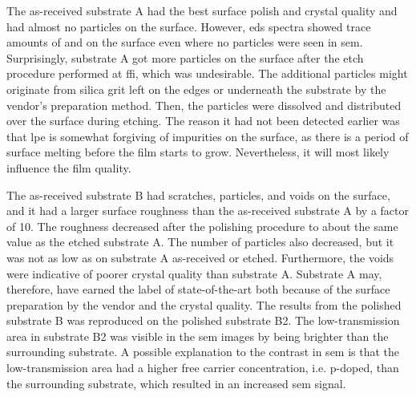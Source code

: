 The as-received substrate A had the best surface polish and crystal quality and had almost no particles on the surface. However, \ac{eds} spectra showed trace amounts of  and  on the surface even where no particles were seen in \ac{sem}. Surprisingly, substrate A got more particles on the surface after the etch procedure performed at \ac{ffi}, which was undesirable. The additional particles might originate from silica grit left on the edges or underneath the substrate by the vendor's preparation method. Then, the particles were dissolved and distributed over the surface during etching. The reason it had not been detected earlier was that \ac{lpe} is somewhat forgiving of impurities on the surface, as there is a period of surface melting before the film starts to grow. Nevertheless, it will most likely influence the film quality.

%

The as-received substrate B had scratches, particles, and voids on the surface, and it had a larger surface roughness than the as-received substrate A by a factor of 10. The roughness decreased after the polishing procedure to about the same value as the etched substrate A. The number of particles also decreased, but it was not as low as on substrate A as-received or etched. Furthermore, the voids were indicative of poorer crystal quality than substrate A. Substrate A may, therefore, have earned the label of state-of-the-art both because of the surface preparation by the vendor and the crystal quality. The results from the polished substrate B was reproduced on the polished substrate B2. The low-transmission area in substrate B2 was visible in the \ac{sem} images by being brighter than the surrounding substrate. A possible explanation to the contrast in \ac{sem} is that the low-transmission area had a higher free carrier concentration, i.e. p-doped, than the surrounding substrate, which resulted in an increased \ac{sem} signal.

